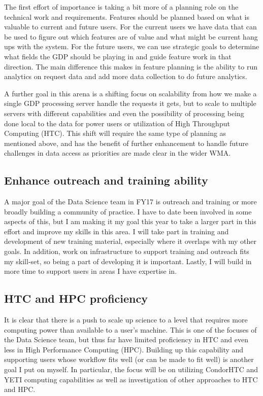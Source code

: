 \documentclass{article}
\begin{document}
The first effort of importance is taking a bit more of a planning role on the technical work and requirements.
Features should be planned based on what is valuable to current and future users.
For the current users we have data that can be used to figure out which features are of value and what might be current hang ups with the  system.
For the future users, we can use strategic goals to determine what fields the GDP should be playing in and guide feature work in that direction.
The main difference this makes in feature planning is the ability to run analytics on request data and add more data collection to do future analytics.

A further goal in this arena is a shifting focus on scalability from how we make a single GDP processing server handle the requests it gets, but to scale to multiple servers with different capabilities and even the possibility of processing being done local to the data for power users or utilization of High Throughput Computing (HTC).
This shift will require the same type of planning as mentioned above, and has the benefit of further enhancement to handle future challenges in data access as priorities are made clear in the wider WMA.

\subsection{Enhance outreach and training ability}

A major goal of the Data Science team in FY17 is outreach and training or more broadly building a community of practice.
I have to date been involved in some aspects of this, but I am making it my goal this year to take a larger part in this effort and improve my skills in this area.
I will take part in training and development of new training material, especially where it overlaps with my other goals.
In addition, work on infrastructure to support training and outreach fits my skill-set, so being a part of developing it is important.
Lastly, I will build in more time to support users in areas I have expertise in.

\subsection{HTC and HPC proficiency}

It is clear that there is a push to scale up science to a level that requires more computing power than available to a user's machine.
This is one of the focuses of the Data Science team, but thus far have limited proficiency in HTC and even less in High Performance Computing (HPC).
Building up this capability and supporting users whose workflow fits well (or can be made to fit well) is another goal I put on myself.
In particular, the focus will be on utilizing CondorHTC and YETI computing capabilities as well as investigation of other approaches to HTC and HPC.
\end{document}
